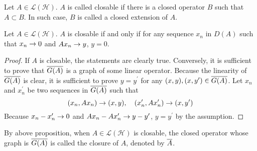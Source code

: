 \documentclass[a4paper,12pt]{article}
\begin{document}
\begin{defn}
    Let $A \in \mathcal{L}(\mathcal{H})$. $A$ is called closable if there is a closed operator $B$ such that $A \subset B$. In such case, $B$ is called a closed extension of $A$.
\end{defn}

\begin{prop}
    Let $A \in \mathcal{L}(\mathcal{H})$. $A$ is closable if and only if for any sequence $x_n$ in $D(A)$ such that $x_n \rightarrow 0$ and $Ax_n \rightarrow y$, $y = 0$.
\end{prop}
\begin{proof}
    If $A$ is closable, the statements are clearly true. Conversely, it is sufficient to prove that $\overline{G(A)}$ is a graph of some linear operator. Because the linearity of $\overline{G(A)}$ is clear, it is sufficient to prove $y = y^\prime$ for any $(x,y),(x,y^\prime) \in \overline{G(A)}$. Let $x_n$ and $x_n^\prime$ be two sequences in $\overline{G(A)}$ such that
    \begin{equation*}
        (x_n,Ax_n) \rightarrow (x,y),\quad (x_n^\prime,Ax_n^\prime) \rightarrow (x,y^\prime)
    \end{equation*}
    Because $x_n-x_n^\prime \rightarrow 0$ and $Ax_n - Ax_n^\prime \rightarrow y-y^\prime$, $y = y^\prime$ by the assumption.
\end{proof}

\begin{defn}
    By above proposition, when $A \in \mathcal{L}(\mathcal{H})$ is closable, the closed operator whose graph is $\overline{G(A)}$ is called the closure of $A$, denoted by $\overline{A}$.
\end{defn}
\end{document}
